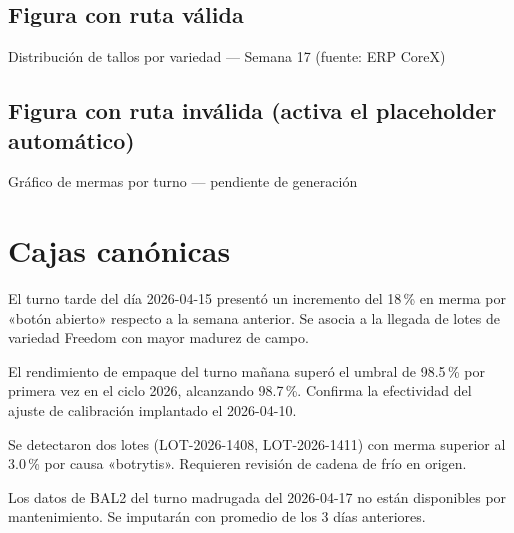 \documentclass{../base/canon}
\begin{document}
\subsection{Figura con ruta válida}

%
  {Distribución de tallos por variedad — Semana 17 (fuente: ERP CoreX)}

\subsection{Figura con ruta inválida (activa el placeholder automático)}

%
  {Gráfico de mermas por turno — pendiente de generación}


\section{Cajas canónicas}

\begin{ObservationBox}
  El turno tarde del día 2026-04-15 presentó un incremento del 18\,\% en merma
  por «botón abierto» respecto a la semana anterior.  Se asocia a la llegada de
  lotes de variedad Freedom con mayor madurez de campo.
\end{ObservationBox}

\begin{KeyFindingBox}
  El rendimiento de empaque del turno mañana superó el umbral de 98.5\,\% por primera
  vez en el ciclo 2026, alcanzando 98.7\,\%.  Confirma la efectividad del ajuste de
  calibración implantado el 2026-04-10.
\end{KeyFindingBox}

\begin{WarningBox}
  Se detectaron dos lotes (LOT-2026-1408, LOT-2026-1411) con merma superior al 3.0\,\%
  por causa «botrytis».  Requieren revisión de cadena de frío en origen.
\end{WarningBox}

 Los datos de BAL2 del turno madrugada del 2026-04-17 no están
disponibles por mantenimiento. Se imputarán con promedio de los 3 días anteriores.
\end{document}
